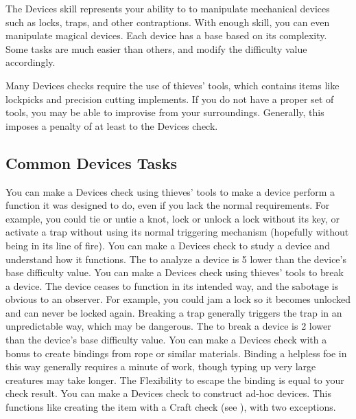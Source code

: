\newpage
{}
    The Devices skill represents your ability to to manipulate mechanical devices such as locks, traps, and other contraptions.
    With enough skill, you can even manipulate magical devices.
    Each device has a base  based on its complexity.
    Some tasks are much easier than others, and modify the difficulty value accordingly.

    Many Devices checks require the use of thieves' tools, which contains items like lockpicks and precision cutting implements.
    If you do not have a proper set of tools, you may be able to improvise from your surroundings.
    Generally, this imposes a penalty of at least  to the Devices check.

    \subsection{Common Devices Tasks}
         You can make a Devices check using thieves' tools to make a device perform a function it was designed to do, even if you lack the normal requirements.
        For example, you could tie or untie a knot, lock or unlock a lock without its key, or activate a trap without using its normal triggering mechanism (hopefully without being in its line of fire).
         You can make a Devices check to study a device and understand how it functions.
        The  to analyze a device is 5 lower than the device's base difficulty value.
         You can make a Devices check using thieves' tools to break a device.
        The device ceases to function in its intended way, and the sabotage is obvious to an observer.
        For example, you could jam a lock so it becomes unlocked and can never be locked again.
        Breaking a trap generally triggers the trap in an unpredictable way, which may be dangerous.
        The  to break a device is 2 lower than the device's base difficulty value.
         You can make a Devices check with a  bonus to create bindings from rope or similar materials.
        Binding a helpless foe in this way generally requires a minute of work, though typing up very large creatures may take longer.
        The Flexibility  to escape the binding is equal to your check result.
         You can make a Devices check to construct ad-hoc devices.
        This functions like creating the item with a Craft check (see ), with two exceptions.
